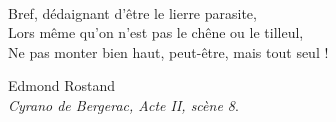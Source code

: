 
\cleardoublepage
\thispagestyle{empty}
\begin{fullwidth}
%
~\vspace{10\baselineskip}

\hfill
\begin{minipage}{10cm}
    {\nohyphenation\noindent%
        Bref, dédaignant d’être le lierre parasite,\\
        Lors même qu’on n’est pas le chêne ou le tilleul,\\
        Ne pas monter bien haut, peut-être, mais tout seul !\\[10pt]
        \begin{flushright}
        {\large\color{myblue}%
            Edmond Rostand\\
            {\itshape Cyrano de Bergerac, Acte II, scène 8}.
        }
        \end{flushright}
    }
\end{minipage}


\end{fullwidth}